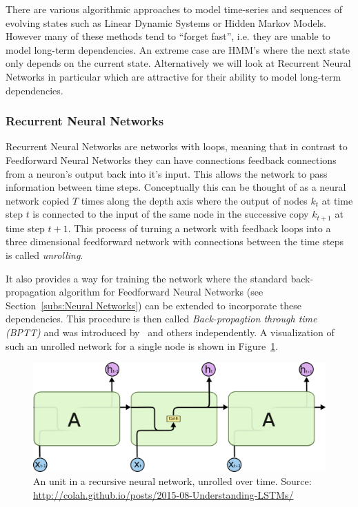 There are various algorithmic approaches to model time-series and sequences of evolving states such as Linear Dynamic Systems or Hidden Markov Models. However many of these methods tend to ``forget fast'', i.e. they are unable to model long-term dependencies. An extreme case are HMM's where the next state only depends on the current state. Alternatively we will look at Recurrent Neural Networks in particular which are attractive for their ability to model long-term dependencies.

\subsubsection*{Recurrent Neural Networks}
\label{subs:Recurrent Neural Networks}

Recurrent Neural Networks are networks with loops, meaning that in contrast to Feedforward Neural Networks they can have connections feedback connections from a neuron's output back into it's input. This allows the network to pass information between time steps. Conceptually this can be thought of as a neural network copied $T$ times along the depth axis where the output of nodes $k_t$ at time step $t$ is connected to the input of the same node in the successive copy $k_{t+1}$ at time step $t+1$. This process of turning a network with feedback loops into a three dimensional feedforward network with connections between the time steps is called \emph{unrolling}.

It also provides a way for training the network where the standard back-propagation algorithm for Feedforward Neural Networks (see Section~\ref{subs:Neural Networks}) can be extended to incorporate these dependencies. This procedure is then called \emph{Back-propagtion through time (BPTT)} and was introduced by~\cite{Werbos:1988aa} and others independently. A visualization of such an unrolled network for a single node is shown in Figure~\ref{fig:RNN}.

\begin{figure}[h]
  \centering
  \includegraphics[width=\textwidth]{img/LSTM3-SimpleRNN.png}
  \caption{An unit in a recursive neural network, unrolled over time. Source: \url{http://colah.github.io/posts/2015-08-Understanding-LSTMs/}}
\label{fig:RNN}
\end{figure}


